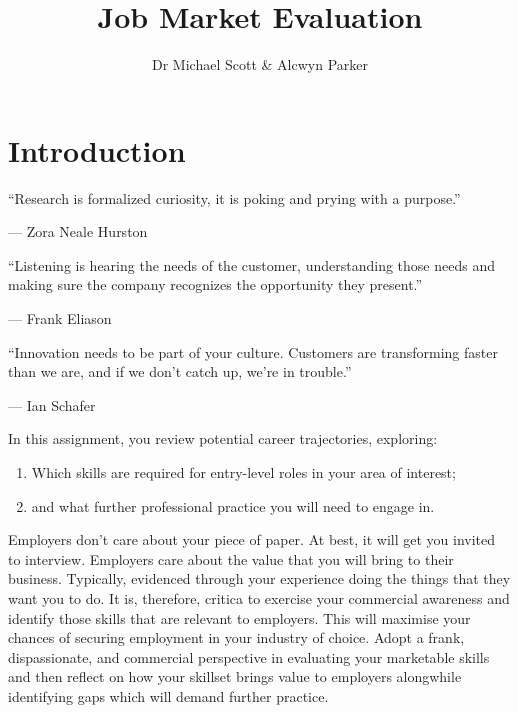 \documentclass{../../fal_assignment}
\title{Job Market Evaluation}
\author{Dr Michael Scott \& Alcwyn Parker}
\begin{document}
\maketitle

\section*{Introduction}

\begin{marginquote}
  ``Research is formalized curiosity, it is poking and prying with a purpose.''
  
   --- Zora Neale Hurston
   
    \marginquoterule
    
    ``Listening is hearing the needs of the customer, understanding those needs and making sure the company recognizes the opportunity they present.''
    
    --- Frank Eliason
    
    \marginquoterule
    
    ``Innovation needs to be part of your culture. Customers are transforming faster than we are, and if we don't catch up, we're in trouble.''
    
    --- Ian Schafer
      
\end{marginquote}

In this assignment, you review potential career trajectories, exploring: 

\begin{enumerate}[label=(\roman*)]
    \item Which skills are required for entry-level roles in your area of interest;
    \item and what further professional practice you will need to engage in.
\end{enumerate}

Employers don't care about your piece of paper. At best, it will get you invited to interview. Employers care about the value that you will bring to their business. Typically, evidenced through your experience doing the things that they want you to do. It is, therefore, critica to exercise your commercial awareness and identify those skills that are relevant to employers. This will maximise your chances of securing employment in your industry of choice. Adopt a frank, dispassionate, and commercial perspective in evaluating your marketable skills and then reflect on how your skillset brings value to employers alongwhile identifying gaps which will demand further practice.
\end{document}
